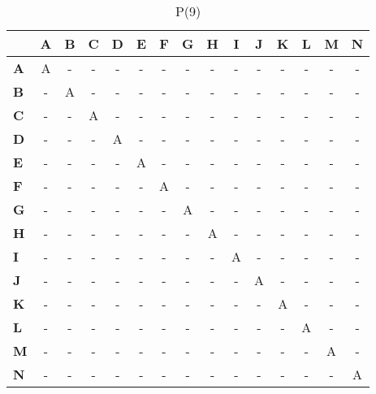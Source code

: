 \documentclass{article}
\begin{document}
\begin{table}[H]\centering
\caption{P(9)}
\begin{tabular}{l c c c c c c c c c c c c c c}
\toprule
 & \textbf{A} & \textbf{B} & \textbf{C} & \textbf{D} & \textbf{E} & \textbf{F} & \textbf{G} & \textbf{H} & \textbf{I} & \textbf{J} & \textbf{K} & \textbf{L} & \textbf{M} & \textbf{N}\\\midrule
\textbf{A} & A & - & - & - & - & - & - & - & - & - & - & - & - & - \\
\textbf{B} & - & A & - & - & - & - & - & - & - & - & - & - & - & - \\
\textbf{C} & - & - & A & - & - & - & - & - & - & - & - & - & - & - \\
\textbf{D} & - & - & - & A & - & - & - & - & - & - & - & - & - & - \\
\textbf{E} & - & - & - & - & A & - & - & - & - & - & - & - & - & - \\
\textbf{F} & - & - & - & - & - & A & - & - & - & - & - & - & - & - \\
\textbf{G} & - & - & - & - & - & - & A & - & - & - & - & - & - & - \\
\textbf{H} & - & - & - & - & - & - & - & A & - & - & - & - & - & - \\
\textbf{I} & - & - & - & - & - & - & - & - & A & - & - & - & - & - \\
\textbf{J} & - & - & - & - & - & - & - & - & - & A & - & - & - & - \\
\textbf{K} & - & - & - & - & - & - & - & - & - & - & A & - & - & - \\
\textbf{L} & - & - & - & - & - & - & - & - & - & - & - & A & - & - \\
\textbf{M} & - & - & - & - & - & - & - & - & - & - & - & - & A & - \\
\textbf{N} & - & - & - & - & - & - & - & - & - & - & - & - & - & A \\
\bottomrule
\end{tabular}
\end{table}
\end{document}
